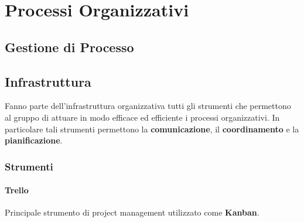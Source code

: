\chapter{Processi Organizzativi}

\section{Gestione di Processo}

\section{Infrastruttura}
Fanno parte dell'infrastruttura organizzativa tutti gli strumenti che permettono al gruppo di attuare in modo efficace ed efficiente i processi organizzativi. In particolare tali strumenti permettono la \textbf{comunicazione}, il \textbf{coordinamento} e la \textbf{pianificazione}.

\subsection{Strumenti}
\subsubsection{Trello}
Principale strumento di project management utilizzato come \textbf{Kanban}. 

